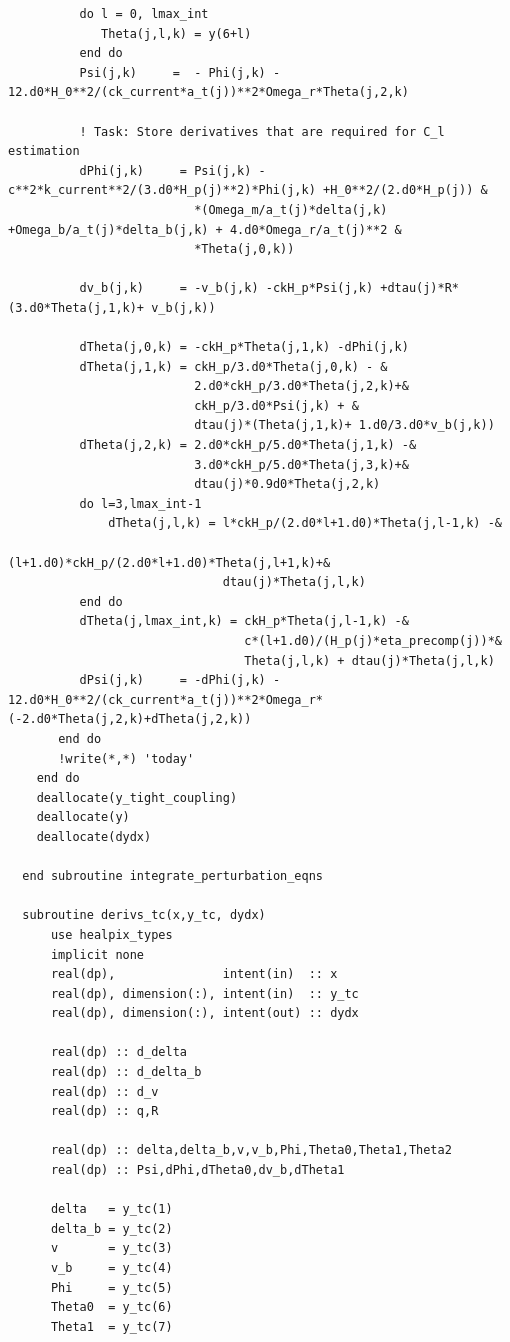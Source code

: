 \documentclass[a4paper]{report}
\begin{document}
\begin{verbatim}
          do l = 0, lmax_int
             Theta(j,l,k) = y(6+l)
          end do
          Psi(j,k)     =  - Phi(j,k) - 12.d0*H_0**2/(ck_current*a_t(j))**2*Omega_r*Theta(j,2,k)

          ! Task: Store derivatives that are required for C_l estimation
          dPhi(j,k)     = Psi(j,k) -c**2*k_current**2/(3.d0*H_p(j)**2)*Phi(j,k) +H_0**2/(2.d0*H_p(j)) &
                          *(Omega_m/a_t(j)*delta(j,k) +Omega_b/a_t(j)*delta_b(j,k) + 4.d0*Omega_r/a_t(j)**2 &
                          *Theta(j,0,k))

          dv_b(j,k)     = -v_b(j,k) -ckH_p*Psi(j,k) +dtau(j)*R*(3.d0*Theta(j,1,k)+ v_b(j,k))

          dTheta(j,0,k) = -ckH_p*Theta(j,1,k) -dPhi(j,k)
          dTheta(j,1,k) = ckH_p/3.d0*Theta(j,0,k) - &
                          2.d0*ckH_p/3.d0*Theta(j,2,k)+&
                          ckH_p/3.d0*Psi(j,k) + &
                          dtau(j)*(Theta(j,1,k)+ 1.d0/3.d0*v_b(j,k))
          dTheta(j,2,k) = 2.d0*ckH_p/5.d0*Theta(j,1,k) -&
                          3.d0*ckH_p/5.d0*Theta(j,3,k)+&
                          dtau(j)*0.9d0*Theta(j,2,k)
          do l=3,lmax_int-1
              dTheta(j,l,k) = l*ckH_p/(2.d0*l+1.d0)*Theta(j,l-1,k) -&
                              (l+1.d0)*ckH_p/(2.d0*l+1.d0)*Theta(j,l+1,k)+&
                              dtau(j)*Theta(j,l,k)
          end do
          dTheta(j,lmax_int,k) = ckH_p*Theta(j,l-1,k) -&
                                 c*(l+1.d0)/(H_p(j)*eta_precomp(j))*&
                                 Theta(j,l,k) + dtau(j)*Theta(j,l,k)
          dPsi(j,k)     = -dPhi(j,k) - 12.d0*H_0**2/(ck_current*a_t(j))**2*Omega_r*(-2.d0*Theta(j,2,k)+dTheta(j,2,k))
       end do
       !write(*,*) 'today'
    end do
    deallocate(y_tight_coupling)
    deallocate(y)
    deallocate(dydx)

  end subroutine integrate_perturbation_eqns

  subroutine derivs_tc(x,y_tc, dydx)
      use healpix_types
      implicit none
      real(dp),               intent(in)  :: x
      real(dp), dimension(:), intent(in)  :: y_tc
      real(dp), dimension(:), intent(out) :: dydx

      real(dp) :: d_delta
      real(dp) :: d_delta_b
      real(dp) :: d_v
      real(dp) :: q,R

      real(dp) :: delta,delta_b,v,v_b,Phi,Theta0,Theta1,Theta2
      real(dp) :: Psi,dPhi,dTheta0,dv_b,dTheta1

      delta   = y_tc(1)
      delta_b = y_tc(2)
      v       = y_tc(3)
      v_b     = y_tc(4)
      Phi     = y_tc(5)
      Theta0  = y_tc(6)
      Theta1  = y_tc(7)


\end{verbatim}
\end{document}
